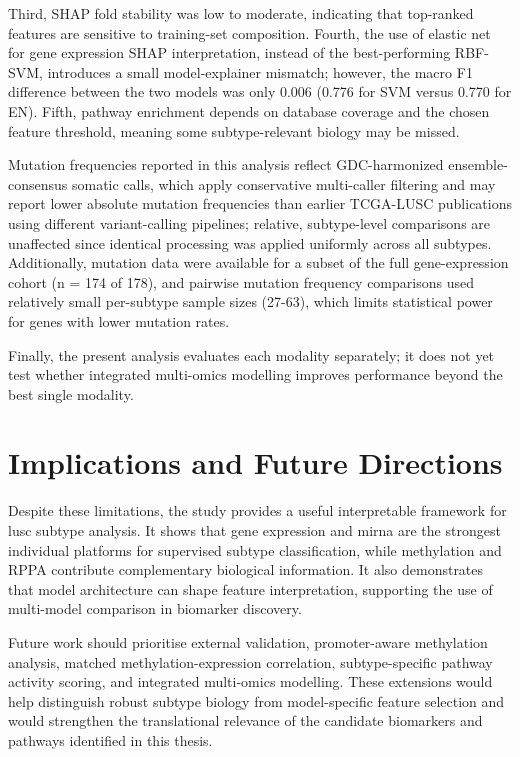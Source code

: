 Third, SHAP fold stability was low to moderate, indicating that top-ranked features are sensitive to training-set composition. Fourth, the use of elastic net for gene expression SHAP interpretation, instead of the best-performing RBF-SVM, introduces a small model-explainer mismatch; however, the macro F1 difference between the two models was only 0.006 (0.776 for SVM versus 0.770 for EN). Fifth, pathway enrichment depends on database coverage and the chosen feature threshold, meaning some subtype-relevant biology may be missed. 

Mutation frequencies reported in this analysis reflect GDC-harmonized ensemble-consensus somatic calls, which apply conservative multi-caller filtering and may report lower absolute mutation frequencies than earlier TCGA-LUSC publications using different variant-calling pipelines; relative, subtype-level comparisons are unaffected since identical processing was applied uniformly across all subtypes. Additionally, mutation data were available for a subset of the full gene-expression cohort (n = 174 of 178), and pairwise mutation frequency comparisons used relatively small per-subtype sample sizes (27-63), which limits statistical power for genes with lower mutation rates.

Finally, the present analysis evaluates each modality separately; it does not yet test whether integrated multi-omics modelling improves performance beyond the best single modality.

\section{Implications and Future Directions}

Despite these limitations, the study provides a useful interpretable framework for \gls{lusc} subtype analysis. It shows that gene expression and \gls{mirna} are the strongest individual platforms for supervised subtype classification, while methylation and RPPA contribute complementary biological information. It also demonstrates that model architecture can shape feature interpretation, supporting the use of multi-model comparison in biomarker discovery.

Future work should prioritise external validation, promoter-aware methylation analysis, matched methylation-expression correlation, subtype-specific pathway activity scoring, and integrated multi-omics modelling. These extensions would help distinguish robust subtype biology from model-specific feature selection and would strengthen the translational relevance of the candidate biomarkers and pathways identified in this thesis.
